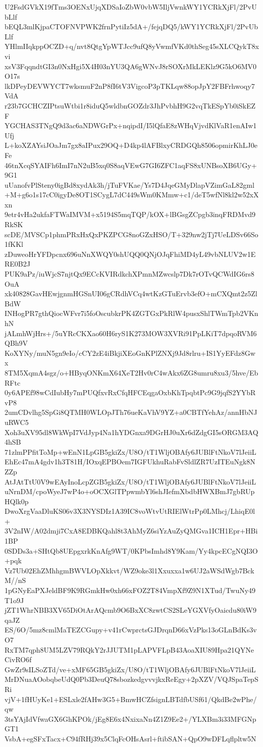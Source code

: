 U2FsdGVkX19fTms3OENxUjqXDSaIoZbW0vbW5IljVwnkWY1YCRkXjFl/2PvUbLlf
bEQL3mlKjpaCTOFNVPWK2frnPytiIz5dA+/fejqDQ5/kWY1YCRkXjFl/2PvUbLlf
YHlmIIqkppOCZD+q/nvt8QtgYpWTJcc9ufQ8yVwmfVKd0thSeg45sXLCQykT8xvi
xsV3FqqndtGI3n0NxHgi5X4H03nYU3QA6gWNvJ8rSOXrMkLEKlz9G5kO6MV0O17s
lkDPeyDEVWYCT7wksmuF2nP8fI6tV3VigcoP3pTKLqw88opJpY2FBFrhwoqy7VdA
r23b7GCHCZIPtsuWtbi1r8iduQ5wldbnGOZdr3JhPvbhH9G2vqTkESpYb0iSkEZF
YGCHAS3TNgQ9d3ac6aNDWGrPx+nqipdI/I5lQfaE8zWHqVjvdKlVaR1enAIw1Ufj
L+koXZAYsiJOaJm7gx8aIPux29OQ+D4kp4lAFBlxyCRDGQh8506opmirKhLJ0eFe
46tnXcqSYAIFh6ImI7nN2uB5xq0S8aqVEwG7GI6ZFC1aqFS8xUNBsoXB6UGy+9G1
uUanofvPlSteny0igBd8xydAk3h/jTuFVKae/Ys7D4JqeGMyDlapVZimGaL82gml
+M+g6o1s17cC0igyDe8OT1SCygL7dC449sWm0KMmw+c1/deT5wfNl8kl2w52xXxn
9etr4vHa2ukfaFTWaIMVM+x5194S5mqTQP/kOX+lBGsgZCpgb3inqFRDMvd9RkSK
scDE/MVSCp1phmPRxHxQxPKZPCG8noGZxHSO/T+329nw2jTj7UeLDSv66So1fKKl
zDuweoHrYFDpcnx696uNnXWQY0shUQQ0QNjOJqFhiMD4yL49vbNLUV2w1ERE0B2J
PUK9aPz/iuWjcS7njtQx9ECcKVIRdkchXPmnMZwcslp7Dk7rOTvQCWdIG6rs8OuA
xk40828GavHEwjgnmHGSnUI06gCRdhVCq4wtKzGTuErvb3efO+mCXQmt2z5ZlBdW
INHogPR7gthQiocWFvr7i5foOscubkrPK4ZGTGxPkRlW4pusxShlTWmTpb2VKnhN
jALmhWjHrs+/5uYRcCKXao60H6ryS1K273MOW3XVRi91PpLKiT7dpqoRVM6QBh9V
KoXYNy/muN5gn9eIo/cCY2zE4iBkjiXEoGnKPlZNXj9Jd8rlru+IS1YyEFdz8Gwx
8TM5XqmA4sgz/o+HByqONKmX64XeT2Hv0rC4wAkx6ZG8umru8xu3/5hve/EbRFtc
0y6APEf98wCdIubHy7mPUQfxvRxCfqHFCEqgaOxbKhTpqbtPc9G9jqfS2YYbRvP8
2umCDvlhg5SpGi8QTMH0WLOpJTh76ueKaVhV9YZ+a0CBTfYehAz/annHbNJuRWC5
Xoh3uXV95dl8WkWpI7VdJyp4Na1hYDGnxa9DGrHJ0uXr6dZdgGI5sORGM3AQ4hSB
71zlmPPfitToMp+wEnN1LpGB5gkiZx/U8O/tT1WljOBAfy6JUBlFtNkoV7lJeiiL
EhEc47mA4gdv1h3T81H/IOxqEPBOem7IGFUkhuRabFvSldlZR7UzITEuNgk8NZZp
AtJAtTtU0V9wEAyInoLcpZGB5gkiZx/U8O/tT1WljOBAfy6JUBlFtNkoV7lJeiiL
uNrnDM/cpoWyeJ7wP4o+oOCXGlTPpwmbYl6shJIefmXbdbHWXBmJ7gbRUpHQlk0p
DwoXrgVaaDluKS06v3X3NYSDIz1A39IC8voWtvUtRIElWtrPp0LMhcj/LhiqE0l+
3V2nIW/A02dmji7CxA8EDBKQahl8t3AhMyZ6siYzAuZyQMGva1ICH1Epr+HBi1BP
0SDDs3a+SHtQb8UEpgxrkKnAfg9WT/0KPbsImhd8Y9Kam/Yy4kpcECgNQI3O+pqk
Vz7Ub02EhZMhhgmBWVLOpXkkvt/WZ9oke3l1Xxuxxa1w6UJ2aWSdWgb7BckM//nS
1pGNyEaPXJeldBF9K9RGmkHw0xh66xFOZ2T84VmpXf9Z9N1XTud/TwuNy49T1o9J
jZT1WhrNBB3XV65DiOtArAQcmb9O6BxXC8zwtCS2SLeYGXVfyOaicdu80iW9qaJZ
ES/6O/5mz8cmlMaTEZCGupy+v41rCwprctsGJDrqnD66xVzPks13oGLnBdKs3vO7
RxTM7qph8UM5LZV79RQkY2rJJUTM1pLAPVFLpB43AoaXIU89Hpa21QYNeCivRO6f
GwZr9sILSoZTd/ve+xMF65GB5gkiZx/U8O/tT1WljOBAfy6JUBlFtNkoV7lJeiiL
MrDNuaAOobqbeUdQ0Pb3DeuQ78sbozkedgvvvjkxReEgy+2pXZV/VQJSpaTepSRi
vjV+1fHUyKe1+ESLxle2fAHw3G5+BmwHCZfsignLBTdfbUSf61/QkdBe2wPhe/qw
3tsYAjIdVfwaGX6GhKPOk/jEg8E6x4NxixaNn4Z1Z9Ee2+/YLXBm3i33MFGNpGT1
VsbA+egSFxTacx+C94fRHj39x5ClqFcOHsAsrl+ftibSAN+QpO9wDFLqflpltw5N
